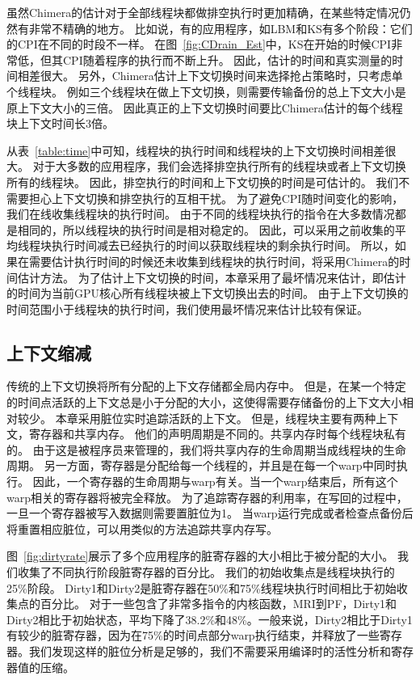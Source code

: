 虽然Chimera的估计对于全部线程块都做排空执行时更加精确，在某些特定情况仍然有非常不精确的地方。
比如说，有的应用程序，如LBM和KS有多个阶段：它们的CPI在不同的时段不一样。
在图~\ref{fig:CDrain_Est}中，KS在开始的时候CPI非常低，但其CPI随着程序的执行而不断上升。
因此，估计的时间和真实测量的时间相差很大。
另外，Chimera估计上下文切换时间来选择抢占策略时，只考虑单个线程块。
例如三个线程块在做上下文切换，则需要传输备份的总上下文大小是原上下文大小的三倍。
因此真正的上下文切换时间要比Chimera估计的每个线程块上下文时间长3倍。

从表~\ref{table:time}中可知，线程块的执行时间和线程块的上下文切换时间相差很大。
对于大多数的应用程序，我们会选择排空执行所有的线程块或者上下文切换所有的线程块。
因此，排空执行的时间和上下文切换的时间是可估计的。
我们不需要担心上下文切换和排空执行的互相干扰。
为了避免CPI随时间变化的影响，我们在线收集线程块的执行时间。
由于不同的线程块执行的指令在大多数情况都是相同的，所以线程块的执行时间是相对稳定的。
因此，可以采用之前收集的平均线程块执行时间减去已经执行的时间以获取线程块的剩余执行时间。
所以，如果在需要估计执行时间的时候还未收集到线程块的执行时间，将采用Chimera的时间估计方法。
为了估计上下文切换的时间，本章采用了最坏情况来估计，即估计的时间为当前GPU核心所有线程块被上下文切换出去的时间。
由于上下文切换的时间范围小于线程块的执行时间，我们使用最坏情况来估计比较有保证。


\subsection{上下文缩减}
传统的上下文切换将所有分配的上下文存储都全局内存中。
但是，在某一个特定的时间点活跃的上下文总是小于分配的大小，这使得需要存储备份的上下文大小相对较少。
本章采用脏位实时追踪活跃的上下文。
但是，线程块主要有两种上下文，寄存器和共享内存。
他们的声明周期是不同的。共享内存时每个线程块私有的。
由于这是被程序员来管理的，我们将共享内存的生命周期当成线程块的生命周期。
另一方面，寄存器是分配给每一个线程的，并且是在每一个warp中同时执行。
因此，一个寄存器的生命周期与warp有关。当一个warp结束后，所有这个warp相关的寄存器将被完全释放。
为了追踪寄存器的利用率，在写回的过程中，一旦一个寄存器被写入数据则需要置脏位为1。
当warp运行完成或者检查点备份后将重置相应脏位，可以用类似的方法追踪共享内存写。

图~\ref{fig:dirtyrate}展示了多个应用程序的脏寄存器的大小相比于被分配的大小。
我们收集了不同执行阶段脏寄存器的百分比。
我们的初始收集点是线程块执行的25\%阶段。
Dirty1和Dirty2是脏寄存器在50\%和75\%线程块执行时间相比于初始收集点的百分比。
对于一些包含了非常多指令的内核函数，MRI到PF，Dirty1和Dirty2相比于初始状态，平均下降了38.2\%和48\%。一般来说，Dirty2相比于Dirty1有较少的脏寄存器，因为在75\%的时间点部分warp执行结束，并释放了一些寄存器。我们发现这样的脏位分析是足够的，我们不需要采用编译时的活性分析和寄存器值的压缩。


